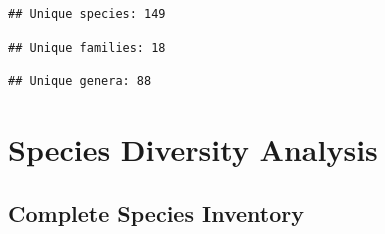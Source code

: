 \documentclass[
]{article}
\newenvironment{Shaded}{\begin{snugshade}}{\end{snugshade}}
\newcommand{\FunctionTok}[1]{\textcolor[rgb]{0.13,0.29,0.53}{\textbf{#1}}}
\newcommand{\NormalTok}[1]{#1}
\newcommand{\SpecialCharTok}[1]{\textcolor[rgb]{0.81,0.36,0.00}{\textbf{#1}}}
\newcommand{\StringTok}[1]{\textcolor[rgb]{0.31,0.60,0.02}{#1}}
\begin{document}
\begin{verbatim}
## Unique species: 149
\end{verbatim}

\begin{Shaded}
\end{Shaded}

\begin{verbatim}
## Unique families: 18
\end{verbatim}

\begin{Shaded}
\end{Shaded}

\begin{verbatim}
## Unique genera: 88
\end{verbatim}

\section{Species Diversity Analysis}\label{species-diversity-analysis}

\subsection{Complete Species
Inventory}\label{complete-species-inventory}
\end{document}
